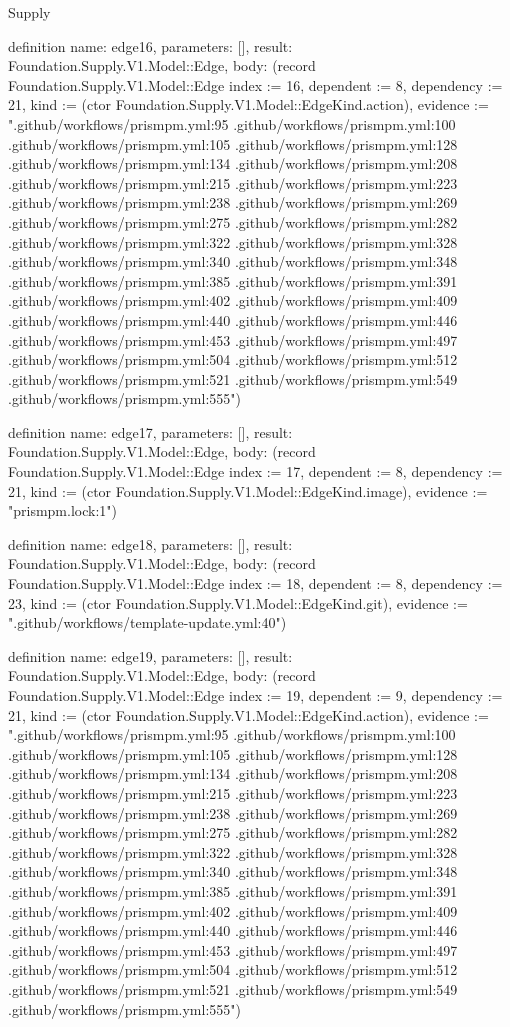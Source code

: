 \begin{lexlean}{Supply}
\begin{semanticmodule}
definition{
  name: edge16,
  parameters: [],
  result: Foundation.Supply.V1.Model::Edge,
  body: (record Foundation.Supply.V1.Model::Edge {index := 16, dependent := 8, dependency := 21, kind := (ctor Foundation.Supply.V1.Model::EdgeKind.action), evidence := ".github/workflows/prismpm.yml:95 .github/workflows/prismpm.yml:100 .github/workflows/prismpm.yml:105 .github/workflows/prismpm.yml:128 .github/workflows/prismpm.yml:134 .github/workflows/prismpm.yml:208 .github/workflows/prismpm.yml:215 .github/workflows/prismpm.yml:223 .github/workflows/prismpm.yml:238 .github/workflows/prismpm.yml:269 .github/workflows/prismpm.yml:275 .github/workflows/prismpm.yml:282 .github/workflows/prismpm.yml:322 .github/workflows/prismpm.yml:328 .github/workflows/prismpm.yml:340 .github/workflows/prismpm.yml:348 .github/workflows/prismpm.yml:385 .github/workflows/prismpm.yml:391 .github/workflows/prismpm.yml:402 .github/workflows/prismpm.yml:409 .github/workflows/prismpm.yml:440 .github/workflows/prismpm.yml:446 .github/workflows/prismpm.yml:453 .github/workflows/prismpm.yml:497 .github/workflows/prismpm.yml:504 .github/workflows/prismpm.yml:512 .github/workflows/prismpm.yml:521 .github/workflows/prismpm.yml:549 .github/workflows/prismpm.yml:555"})
}

definition{
  name: edge17,
  parameters: [],
  result: Foundation.Supply.V1.Model::Edge,
  body: (record Foundation.Supply.V1.Model::Edge {index := 17, dependent := 8, dependency := 21, kind := (ctor Foundation.Supply.V1.Model::EdgeKind.image), evidence := "prismpm.lock:1"})
}

definition{
  name: edge18,
  parameters: [],
  result: Foundation.Supply.V1.Model::Edge,
  body: (record Foundation.Supply.V1.Model::Edge {index := 18, dependent := 8, dependency := 23, kind := (ctor Foundation.Supply.V1.Model::EdgeKind.git), evidence := ".github/workflows/template-update.yml:40"})
}

definition{
  name: edge19,
  parameters: [],
  result: Foundation.Supply.V1.Model::Edge,
  body: (record Foundation.Supply.V1.Model::Edge {index := 19, dependent := 9, dependency := 21, kind := (ctor Foundation.Supply.V1.Model::EdgeKind.action), evidence := ".github/workflows/prismpm.yml:95 .github/workflows/prismpm.yml:100 .github/workflows/prismpm.yml:105 .github/workflows/prismpm.yml:128 .github/workflows/prismpm.yml:134 .github/workflows/prismpm.yml:208 .github/workflows/prismpm.yml:215 .github/workflows/prismpm.yml:223 .github/workflows/prismpm.yml:238 .github/workflows/prismpm.yml:269 .github/workflows/prismpm.yml:275 .github/workflows/prismpm.yml:282 .github/workflows/prismpm.yml:322 .github/workflows/prismpm.yml:328 .github/workflows/prismpm.yml:340 .github/workflows/prismpm.yml:348 .github/workflows/prismpm.yml:385 .github/workflows/prismpm.yml:391 .github/workflows/prismpm.yml:402 .github/workflows/prismpm.yml:409 .github/workflows/prismpm.yml:440 .github/workflows/prismpm.yml:446 .github/workflows/prismpm.yml:453 .github/workflows/prismpm.yml:497 .github/workflows/prismpm.yml:504 .github/workflows/prismpm.yml:512 .github/workflows/prismpm.yml:521 .github/workflows/prismpm.yml:549 .github/workflows/prismpm.yml:555"})
}


\end{semanticmodule}
\end{lexlean}
